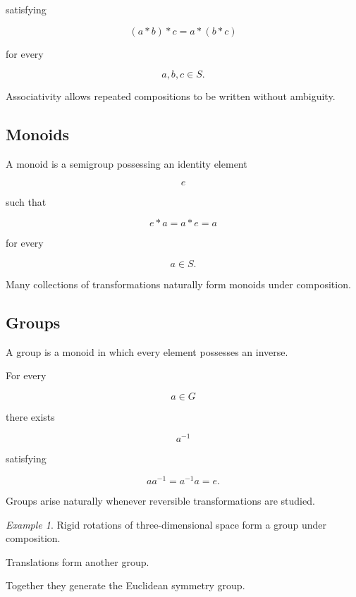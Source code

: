 \documentclass[11pt,fleqn]{book}
\numberwithin{equation}{chapter}
\theoremstyle{plain}
\theoremstyle{definition}
\theoremstyle{remark}
\newtheorem{example}[theorem]{Example}
\begin{document}
satisfying

\[
(a*b)*c
=
a*(b*c)
\]

for every

\[
a,b,c\in S.
\]

Associativity allows repeated compositions to be written without
ambiguity.


\subsection{Monoids}

A monoid is a semigroup possessing an identity element

\[
e
\]

such that

\[
e*a
=
a*e
=
a
\]

for every

\[
a\in S.
\]

Many collections of transformations naturally form monoids under
composition.


\subsection{Groups}

A group is a monoid in which every element possesses an inverse.

For every

\[
a\in G
\]

there exists

\[
a^{-1}
\]

satisfying

\[
aa^{-1}
=
a^{-1}a
=
e.
\]

Groups arise naturally whenever reversible transformations are studied.


\begin{example}

Rigid rotations of three-dimensional space form a group under
composition.

Translations form another group.

Together they generate the Euclidean symmetry group.

\end{example}
\end{document}

